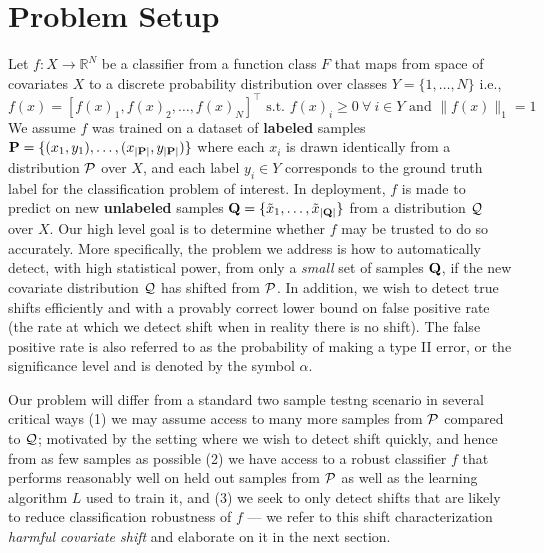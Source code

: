\section{Problem Setup}\label{sec:problem-setup}
Let $f: X\to \mathbb{R}^N $ be a classifier from a function class $F$ that maps from space of covariates $X$ to a discrete probability distribution over classes $Y=\{1,\ldots,N\}$ i.e.,
\[f(x)=[f(x)_1, f(x)_2, \ldots, f(x)_N]^\top\text{ s.t. }f(x)_i \geq 0\ \forall\ i\in Y \text{ and } \|f(x)\|_1 = 1\]
We assume $f$ was trained on a dataset of \textbf{labeled} samples $\mathbf{P}=\{(x_1,y_1),\ldots,(x_{|\mathbf{P}|}, y_{|\mathbf{P}|})\}$ where each $x_i$ is drawn identically from a distribution $\mathcal{P}$ over $X$, and
each label $y_i\in Y$ corresponds to the ground truth label for the classification problem of interest.
In deployment, $f$ is made to predict on new \textbf{unlabeled} samples $\mathbf{Q}=\{\tilde{x}_1,\ldots,\tilde{x}_{|\mathbf{Q}|}\}$ from a distribution $\mathcal{Q}$ over $X$.
Our high level goal is to determine whether $f$ may be trusted to do so accurately.
More specifically, the problem we address is how to automatically detect, with high statistical power, from only a \textit{small} set of samples $\mathbf{Q}$,
if the new covariate distribution $\mathcal{Q}$ has shifted from $\mathcal{P}$.
In addition, we wish to detect true shifts efficiently and with a provably correct lower bound on false positive rate (the rate at which we detect shift when in reality there is no shift).
The false positive rate is also referred to as the probability of making a type II error, or the significance level and is denoted by the symbol $\alpha$.

Our problem will differ from a standard two sample testng scenario in several critical ways (1) we may assume access to many more samples from $\mathcal{P}$
compared to $\mathcal{Q}$; motivated by the setting where we wish to detect shift quickly, and hence from as few samples as possible
(2) we have access to a robust classifier $f$ that performs reasonably well on held out samples from $\mathcal{P}$ as well as the learning algorithm $L$ used to train it, and
(3) we seek to only detect shifts that are likely to reduce classification robustness of $f$ --- we refer to this shift characterization \textit{harmful covariate shift} and elaborate on it in the next section.


